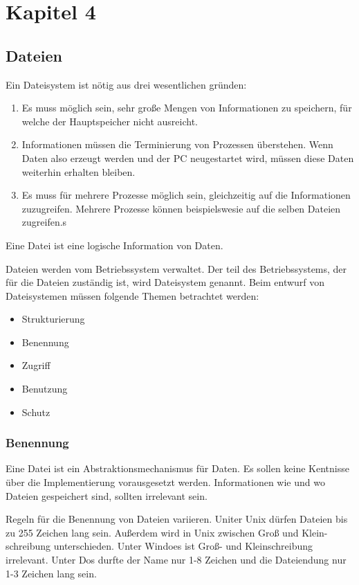 \chapter{Kapitel 4}

\section{Dateien}

Ein Dateisystem ist nötig aus drei wesentlichen gründen:

\begin{enumerate}
    \item Es muss möglich sein, sehr große Mengen von Informationen zu speichern, für welche der Hauptspeicher nicht ausreicht.
    \item Informationen müssen die Terminierung von Prozessen überstehen. Wenn Daten also erzeugt werden und der PC neugestartet wird, müssen diese Daten weiterhin erhalten bleiben.
    \item Es muss für mehrere Prozesse möglich sein, gleichzeitig auf die In\-for\-mation\-en zuzugreifen. Mehrere Prozesse können beispielswesie auf die selben Dateien zugreifen.s
\end{enumerate}

Eine Datei ist eine logische Information von Daten.

Dateien werden vom Betriebssystem verwaltet. Der teil des Betriebssystems, der für die Dateien zuständig ist, wird Dateisystem genannt. Beim entwurf von Dateisystemen müssen folgende Themen betrachtet werden:

\begin{itemize}
    \item Strukturierung
    \item Benennung
    \item Zugriff
    \item Benutzung
    \item Schutz
\end{itemize}

\subsection{Benennung}

Eine Datei ist ein Abstraktionsmechanismus für Daten. Es sollen keine Kentnisse über die Implementierung vorausgesetzt werden. Informationen wie und wo Dateien gespeichert sind, sollten irrelevant sein.

Regeln für die Benennung von Dateien variieren. Uniter Unix dürfen Dateien bis zu 255 Zeichen lang sein. Außerdem wird in Unix zwischen Groß und Klein-schreibung unterschieden. Unter Windoes ist Groß- und Kleinschreibung irrelevant. Unter Dos durfte der Name nur 1-8 Zeichen und die Dateiendung nur 1-3 Zeichen lang sein.


